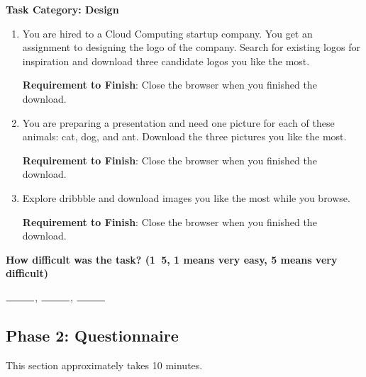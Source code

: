 \textbf{Task Category: Design}

\begin{enumerate}
    \item You are hired to a Cloud Computing startup company. You get an assignment to 
    designing the logo of the company. Search for existing logos for inspiration and 
    download three candidate logos you like the most.

    \textbf{Requirement to Finish}: Close the browser when you finished the download.

    \item You are preparing a presentation and need one picture for each of these animals: 
    cat, dog, and ant. Download the three pictures you like the most.

    \textbf{Requirement to Finish}: Close the browser when you finished the download.

    \item Explore dribbble and download images you like the most while you browse.
    
    \textbf{Requirement to Finish}: Close the browser when you finished the download.

\end{enumerate}

\textbf{How difficult was the task? (1~5, 1 means very easy, 5 means very difficult)}

$\rule{1cm}{0.15mm}$, $\rule{1cm}{0.15mm}$, $\rule{1cm}{0.15mm}$

\subsection{Phase 2: Questionnaire}

This section approximately takes 10 minutes.

